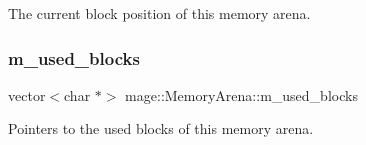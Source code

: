 The current block position of this memory arena. \hypertarget{classmage_1_1_memory_arena_affb37aae6087014287b43d50521dd0fb}{}\label{classmage_1_1_memory_arena_affb37aae6087014287b43d50521dd0fb} 
\subsubsection{\texorpdfstring{m\+\_\+used\+\_\+blocks}{m\_used\_blocks}}
{\footnotesize\ttfamily vector$<$char $\ast$$>$ mage\+::\+Memory\+Arena\+::m\+\_\+used\+\_\+blocks\hspace{0.3cm}{\ttfamily [private]}}

Pointers to the used blocks of this memory arena. 